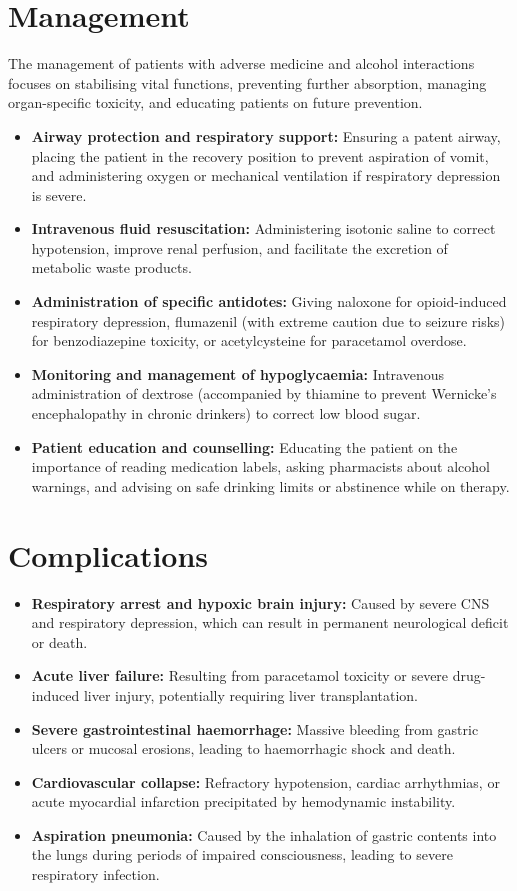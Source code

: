 \section*{Management}
The management of patients with adverse medicine and alcohol interactions focuses on stabilising vital functions, preventing further absorption, managing organ-specific toxicity, and educating patients on future prevention.
\begin{itemize}
    \item \textbf{Airway protection and respiratory support:} Ensuring a patent airway, placing the patient in the recovery position to prevent aspiration of vomit, and administering oxygen or mechanical ventilation if respiratory depression is severe.
    \item \textbf{Intravenous fluid resuscitation:} Administering isotonic saline to correct hypotension, improve renal perfusion, and facilitate the excretion of metabolic waste products.
    \item \textbf{Administration of specific antidotes:} Giving naloxone for opioid-induced respiratory depression, flumazenil (with extreme caution due to seizure risks) for benzodiazepine toxicity, or acetylcysteine for paracetamol overdose.
    \item \textbf{Monitoring and management of hypoglycaemia:} Intravenous administration of dextrose (accompanied by thiamine to prevent Wernicke's encephalopathy in chronic drinkers) to correct low blood sugar.
    \item \textbf{Patient education and counselling:} Educating the patient on the importance of reading medication labels, asking pharmacists about alcohol warnings, and advising on safe drinking limits or abstinence while on therapy.
\end{itemize}

\section*{Complications}
\begin{itemize}
    \item \textbf{Respiratory arrest and hypoxic brain injury:} Caused by severe CNS and respiratory depression, which can result in permanent neurological deficit or death.
    \item \textbf{Acute liver failure:} Resulting from paracetamol toxicity or severe drug-induced liver injury, potentially requiring liver transplantation.
    \item \textbf{Severe gastrointestinal haemorrhage:} Massive bleeding from gastric ulcers or mucosal erosions, leading to haemorrhagic shock and death.
    \item \textbf{Cardiovascular collapse:} Refractory hypotension, cardiac arrhythmias, or acute myocardial infarction precipitated by hemodynamic instability.
    \item \textbf{Aspiration pneumonia:} Caused by the inhalation of gastric contents into the lungs during periods of impaired consciousness, leading to severe respiratory infection.
\end{itemize}

